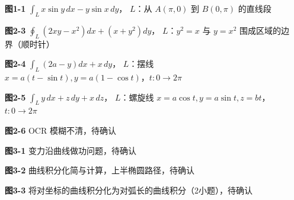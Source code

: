 \documentclass[14pt,a4paper]{ctexart}
\begin{document}
\begin{enumerate}[leftmargin=*,itemsep=8pt]
  \item[\textbf{图1-1}] $\displaystyle\int_L x\sin y\,dx - y\sin x\,dy$，
        $L$：从 $A(\pi,0)$ 到 $B(0,\pi)$ 的直线段
  \item[\textbf{图2-3}] $\displaystyle\oint_L (2xy - x^2)dx + (x + y^2)dy$，
        $L$：$y^2=x$ 与 $y=x^2$ 围成区域的边界（顺时针）
  \item[\textbf{图2-4}] $\displaystyle\int_L (2a - y)dx + x\,dy$，
        $L$：摆线 $x=a(t-\sin t), y=a(1-\cos t)$，$t:0\to2\pi$
  \item[\textbf{图2-5}] $\displaystyle\int_L y\,dx + z\,dy + x\,dz$，
        $L$：螺旋线 $x=a\cos t, y=a\sin t, z=bt$，$t:0\to2\pi$
  \item[\textbf{图2-6}] OCR 模糊不清，待确认
  \item[\textbf{图3-1}] 变力沿曲线做功问题，待确认
  \item[\textbf{图3-2}] 曲线积分化简与计算，上半椭圆路径，待确认
  \item[\textbf{图3-3}] 将对坐标的曲线积分化为对弧长的曲线积分（2小题），待确认
\end{enumerate}
\end{document}
